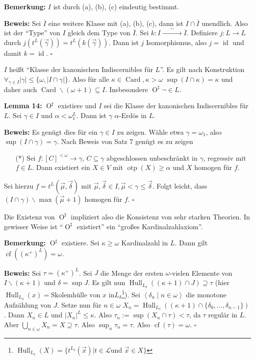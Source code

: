 \documentclass[a4paper,fontsize=11pt]{scrartcl}
\newcommand{\simrightarrow}{\xrightarrow{\phantom{\sim}\sim\phantom{\sim}}}
\newcommand{\osharp}{\operatorname{O}^\sharp}
\newcommand{\Card}{\operatorname{Card}}
\newcommand{\cf}{\operatorname{cf}}
\newcommand{\otp}{\operatorname{otp}}
\newcommand{\id}{\operatorname{id}}
\renewcommand{\bar}[1]{\overline{#1}}
\begin{document}
{\bf Bemerkung:} $I$ ist durch (a), (b), (c) eindeutig bestimmt.

{\bf Beweis:} Sei $\bar{I}$ eine weitere Klasse mit (a), (b), (c),
dann ist $I\cap\bar{I}$ unendlich. Also ist der ``Type'' von $I$
gleich dem Type von $\bar{I}$. Sei
$k:I\simrightarrow\bar{I}$. Definiere $j:L\rightarrow L$
durch $j(t^L(\vec{\gamma}))=t^L(k(\vec{\gamma}))$. Dann ist $j$
Isomorphismus, also $j=\id$ und damit $k=\id$.
\hfill $\square$

$I$ heißt ``Klasse der kanonischen Indiscernibles für $L$''. Es gilt
nach Konstruktion $\forall_{\gamma\in I}
|\gamma|\le\{\omega,|I\cap\gamma|\}$. Also für alle
$\kappa\in\Card,\kappa > \omega$ $\sup(I\cap\kappa)=\kappa$ und daher
auch $\Card\backslash(\omega+1)\subseteq I$. Insbesondere
$\osharp\lnot\in L$.

{\bf Lemma 14:} $\osharp$ existiere und $I$ sei die Klasse der
kanonischen Indiscernibles für $L$. Sei $\gamma\in I$ und
$\alpha<\omega_1^L$. Dann ist $\gamma$ $\alpha$-Erdös in $L$.

{\bf Beweis:} Es genügt dies für ein $\gamma\in I$ zu zeigen. Wähle
etwa $\gamma=\omega_1$, also $\sup(I\cap\gamma) = \gamma$. Nach Beweis
von Satz 7 genügt es zu zeigen

\begin{itemize}
  \item[(*)] Sei $f:[C]^{<\omega}\rightarrow\gamma$,
    $C\subseteq\gamma$ abgeschlossen unbeschränkt in $\gamma$,
    regressiv mit $f\in L$. Dann existiert ein $X\in V$ mit
    $\otp(X)\ge\alpha$ und $X$ homogen für $f$.
\end{itemize}

Sei hierzu $f=t^L(\vec{\mu},\vec{\delta})$ mit
$\vec{\mu},\vec{\delta}\in I,\vec{\mu}<\gamma\le\vec{\delta}$. Folgt
leicht, dass $(I\cap\gamma)\backslash\max(\vec{\mu}+1)$ homogen für
$f$.
\hfill $\square$

Die Existenz von $\osharp$ impliziert also die Konsistenz von sehr
starken Theorien. In gewisser Weise ist ``$\osharp$ existiert'' ein
``großes Kardinalzahlaxiom''.

{\bf Bemerkung:} $\osharp$ existiere. Sei $\kappa\ge\omega$
Kardinalzahl in $L$. Dann gilt $\cf((\kappa^+)^L)=\omega$.

{\bf Beweis:} Sei $\tau=(\kappa^+)^L$. Sei $J$ die Menge der ersten
$\omega$-vielen Elemente von $I\backslash(\kappa+1)$ und $\delta=\sup
J$. Es gilt nun $\operatorname{Hull}_{L_\delta} ((\kappa+1)\cap
J)\supseteq\tau$ (hier
$\operatorname{Hull}_{L_\delta}(x)=\mbox{Skolemhülle von }x\mbox{ in
}L_\delta$\footnote{$\operatorname{Hull}_{L_\delta}(X)=\{t^{L_\delta}(\vec{x})|t\in\mathcal{L}\mbox{
    und }\vec{x}\in X\}$}). Sei $\left<\delta_n\mid n\in\omega\right>$
  die monotone Aufzählung von $J$. Setze nun für $n\in\omega$
  $X_n=\operatorname{Hull}_{L_\delta}((\kappa+1)\cap\{\delta_0,\ldots,\delta_{n-1}\})$. Dann
  $X_n\in L$ und $|X_n|^L\le\kappa$. Also
  $\tau_n:=\sup(X_n\cap\tau)<\tau$, da $\tau$ regulär in $L$. Aber
  $\bigcup_{n\in\omega}X_n=X\supseteq\tau$. Also
  $\sup_n\tau_n=\tau$. Also $\cf(\tau)=\omega$.  \hfill $\square$
\end{document}
